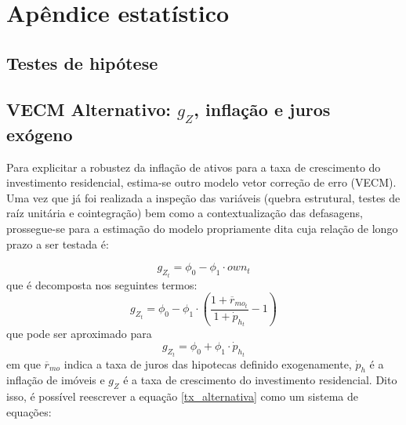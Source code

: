 \titleformat{\chapter}[display]{\normalfont\huge}{\appendixname{} \thechapter}{20pt}{\bfseries\huge}
\chapter{Apêndice estatístico}
\label{Append_Stat}

\section{Testes de hipótese}




\section{VECM Alternativo: $g_Z$, inflação e juros exógeno}

Para explicitar a robustez da inflação de ativos para a taxa de crescimento do investimento residencial, estima-se outro modelo vetor correção de erro (VECM).
Uma vez que já foi realizada a inspeção das variáveis (quebra estrutural, testes de raíz unitária e cointegração) bem como a contextualização das defasagens, prossegue-se para a estimação do modelo propriamente dita cuja relação de longo prazo a ser testada é:

$$
g_{Z_t} = \phi_{0} - \phi_1\cdot own_t
$$
que é decomposta nos seguintes termos:
$$
g_{Z_t} = \phi_{0} - \phi_1\cdot \left(\frac{1+\overline r_{mo_t}}{1+\dot p_{h_t}} -1\right)
$$
que pode ser aproximado para
\begin{equation}
\label{tx_alternativa}
g_{Z_t} = \phi_{0} + \phi_1\cdot \dot p_{h_t}
\end{equation}
em que $\overline r_{mo}$ indica a taxa de juros das hipotecas definido exogenamente, $\dot p_h$ é a inflação de imóveis e $g_Z$ é a taxa de crescimento do investimento residencial.
Dito isso, é possível reescrever a equação \ref{tx_alternativa} como um sistema de equações:

